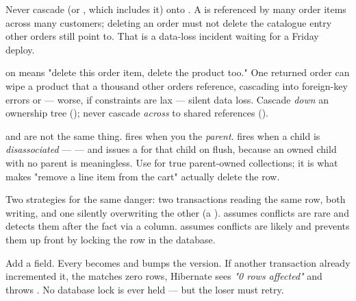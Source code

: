  Never cascade  (or , which includes it) onto . A  is referenced by many order items across many customers; deleting an order must not delete the catalogue entry other orders still point to. That is a data-loss incident waiting for a Friday deploy.

\begin{secwarn}
 on  means "delete this order item, delete the product too." One returned order can wipe a product that a thousand other orders reference, cascading into foreign-key errors or --- worse, if constraints are lax --- silent data loss. Cascade \emph{down} an ownership tree (); never cascade \emph{across} to shared references ().
\end{secwarn}

\begin{dbinsight}
 and  are not the same thing.  fires when you  the \emph{parent}.  fires when a child is \emph{disassociated} ---  --- and issues a  for that child on flush, because an owned child with no parent is meaningless. Use  for true parent-owned collections; it is what makes "remove a line item from the cart" actually delete the row.
\end{dbinsight}


 Two strategies for the same danger: two transactions reading the same row, both writing, and one silently overwriting the other (a ).  assumes conflicts are rare and detects them after the fact via a  column.  assumes conflicts are likely and prevents them up front by locking the row in the database.

 Add a  field. Every  becomes  and bumps the version. If another transaction already incremented it, the  matches zero rows, Hibernate sees \emph{"0 rows affected"} and throws . No database lock is ever held --- but the loser must retry.

